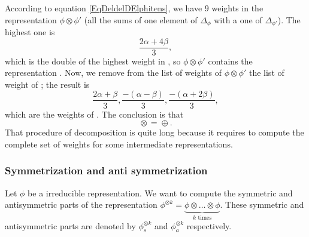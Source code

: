 According to equation \eqref{EqDeldelDElphitens}, we have $9$ weights in the representation $\phi\otimes\phi'$ (all the sums of one element of $\Delta_{\phi}$ with a one of $\Delta_{\phi'}$). The highest one is
\[ 
    \frac{ 2\alpha+4\beta }{ 3 },
\]
which is the double of the highest weight in , so $\phi\otimes\phi'$ contains the representation . Now, we remove from the list of weights of $\phi\otimes\phi'$ the list of weight of ; the result is
\begin{equation}
    \frac{ 2\alpha+\beta }{ 3 },\frac{ -(\alpha-\beta) }{ 3 },\frac{ -(\alpha+2\beta) }{ 3 },
\end{equation}
which are the weights of . The conclusion is that
\begin{equation}
    \text{}\otimes\text{}=\text{}\oplus\text{}.
\end{equation}
That procedure of decomposition is quite long because it requires to compute the complete set of weights for some intermediate representations.

                    \subsubsection{Symmetrization and anti symmetrization}

Let $\phi$ be a irreducible representation. We want to compute the symmetric and antisymmetric parts of the representation $\phi^{\otimes k}=\underbrace{\phi\otimes\ldots\otimes\phi}_{\text{$k$ times}}$. These symmetric and antisymmetric parts are denoted by $\phi^{\otimes k}_s$ and $\phi^{\otimes k}_a$ respectively.

